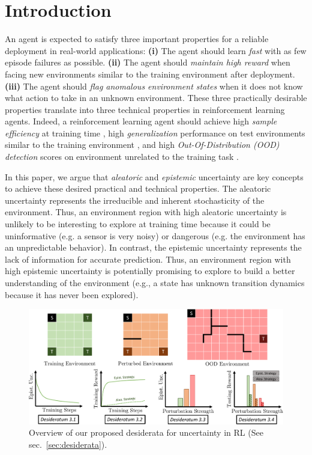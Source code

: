 \vspace{-3mm}
\section{Introduction}
\label{sec:introduction}

An agent is expected to satisfy three important properties for a reliable deployment in real-world applications: \textbf{(i)} The agent should learn \emph{fast} with as few episode failures as possible. \textbf{(ii)} The agent should \emph{maintain high reward} when facing new environments similar to the training environment after deployment. \textbf{(iii)} The agent should \emph{flag anomalous environment states} when it does not know what action to take in an unknown environment. These three practically desirable properties translate into three technical properties in reinforcement learning agents. Indeed, a reinforcement learning agent should achieve high \emph{sample efficiency} at training time \cite{sample-efficient-ac}, high \emph{generalization} performance on test environments similar to the training environment \cite{epistemic-pomdp}, and high \emph{Out-Of-Distribution (OOD) detection} scores on environment unrelated to the training task \cite{ood-detection-survey, ood-automotive-perception}. 

In this paper, we argue that \emph{aleatoric} and \emph{epistemic} uncertainty are key concepts to achieve these desired practical and technical properties. The aleatoric uncertainty represents the irreducible and inherent stochasticity of the environment. Thus, an environment region with high aleatoric uncertainty is unlikely to be interesting to explore at training time because it could be uninformative (e.g. a sensor is very noisy) or dangerous (e.g. the environment has an unpredictable behavior). In contrast, the epistemic uncertainty represents the lack of information for accurate prediction. Thus, an environment region with high epistemic uncertainty is potentially promising to explore to build a better understanding of the environment (e.g., a state has unknown transition dynamics because it has never been explored).

\begin{figure}[t]
    \centering
    \includegraphics[width=.99\linewidth]{sections/011_icml2022/resources/diagram-cropped_2.pdf}
    \caption{Overview of our proposed desiderata for uncertainty in RL (See sec.~\ref{sec:desiderata}).}
    \label{fig:diagram}
\end{figure}

